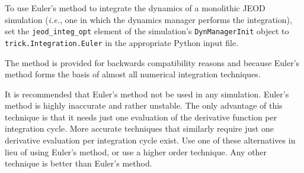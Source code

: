 To use Euler's method to integrate the dynamics of a monolithic JEOD simulation
(\emph{i.e.}, one in which the dynamics manager performs the integration),
set the {\tt{jeod\_integ\_opt}} element of the simulation's
{\tt{DynManagerInit}} object to {\tt{trick.Integration.Euler}}
in the appropriate Python input file.

The method is provided for backwards compatibility reasons and because
Euler's method forms the basis of almost all numerical integration techniques.

It is recommended that Euler's method not be used in any simulation.
Euler's method is highly inaccurate and rather unstable.
The only advantage of this technique is that it needs just one
evaluation of the derivative function per integration cycle.
More accurate techniques that similarly require just one derivative evaluation
per integration cycle exist.
Use one of these alternatives in lieu of using Euler's method,
or use a higher order technique.
Any other technique is better than Euler's method.
